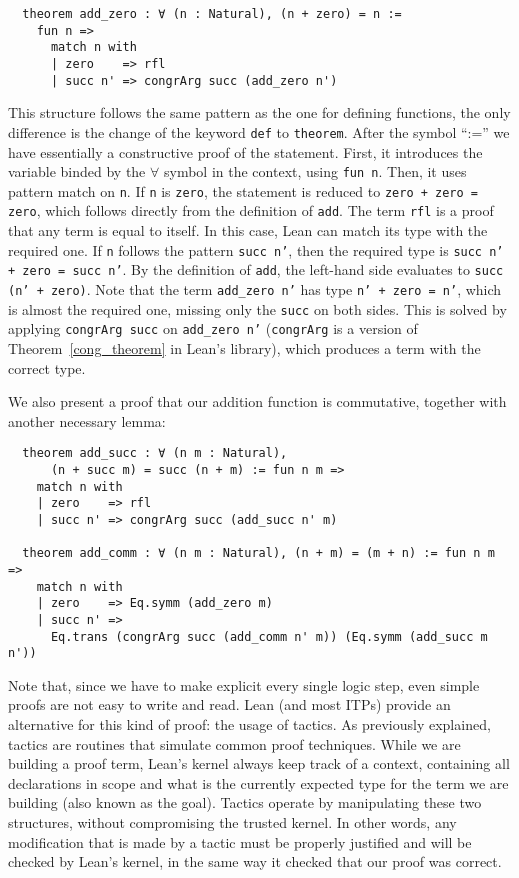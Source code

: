 \begin{verbatim}
  theorem add_zero : ∀ (n : Natural), (n + zero) = n :=
    fun n =>
      match n with
      | zero    => rfl
      | succ n' => congrArg succ (add_zero n')
\end{verbatim}

This structure follows the same pattern as the one for defining functions, the only difference is the change of the keyword \texttt{def} to \texttt{theorem}. After the symbol ``:='' we have essentially a constructive proof of the statement. First, it introduces the variable binded by the $\forall$ symbol in the context, using \texttt{fun n}. Then, it uses pattern match on \texttt{n}. If \texttt{n} is \texttt{zero}, the statement is reduced to \texttt{zero + zero = zero}, which follows directly from the definition of \texttt{add}. The term \texttt{rfl} is a proof that any term is equal to itself. In this case, Lean can match its type with the required one. If \texttt{n} follows the pattern \texttt{succ n'}, then the required type is \texttt{succ n' + zero = succ n'}. By the definition of \texttt{add}, the left-hand side evaluates to \texttt{succ (n' + zero)}.
Note that the term \texttt{add\_zero n'} has type \texttt{n' + zero = n'}, which is almost the required one, missing only the \texttt{succ} on both sides. This is solved by applying \texttt{congrArg succ} on \texttt{add\_zero n'} (\texttt{congrArg} is a version of Theorem~\ref{cong_theorem} in Lean's library), which produces a term with the correct type.


We also present a proof that our addition function is commutative, together with another necessary lemma:

\begin{verbatim}
  theorem add_succ : ∀ (n m : Natural),
      (n + succ m) = succ (n + m) := fun n m =>
    match n with
    | zero    => rfl
    | succ n' => congrArg succ (add_succ n' m)

  theorem add_comm : ∀ (n m : Natural), (n + m) = (m + n) := fun n m =>
    match n with
    | zero    => Eq.symm (add_zero m)
    | succ n' =>
      Eq.trans (congrArg succ (add_comm n' m)) (Eq.symm (add_succ m n'))
\end{verbatim}

Note that, since we have to make explicit every single logic step, even simple proofs are not easy to write and read. Lean (and most ITPs) provide an alternative for this kind of proof: the usage of tactics. As previously explained, tactics are routines that simulate common proof techniques. While we are building a proof term, Lean's kernel always keep track of a context, containing all declarations in scope and what is the currently expected type for the term we are building (also known as the goal). Tactics operate by manipulating these two structures, without compromising the trusted kernel. In other words, any modification that is made by a tactic must be properly justified and will be checked by Lean's kernel, in the same way it checked that our proof was correct.

